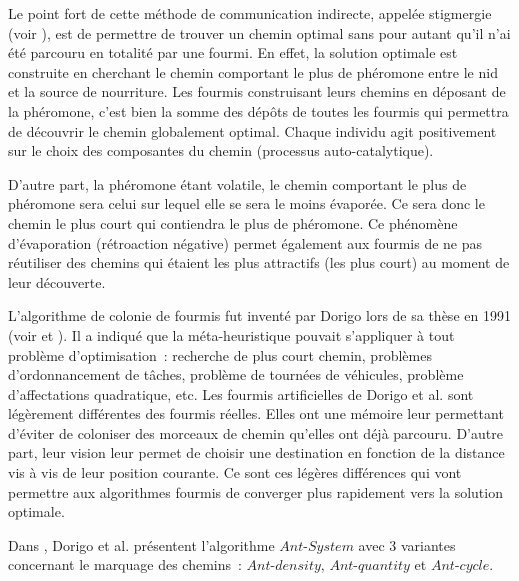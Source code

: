 Le point fort de cette méthode de communication indirecte, appelée stigmergie (voir \cite{Grasse1959}), est de permettre de trouver un chemin optimal sans pour autant qu'il n'ai été parcouru en totalité par une fourmi. En effet, la solution optimale est construite en cherchant le chemin comportant le plus de phéromone entre le nid et la source de nourriture. Les fourmis construisant leurs chemins en déposant de la phéromone, c'est bien la somme des dépôts de toutes les fourmis qui permettra de découvrir le chemin globalement optimal. Chaque individu agit positivement sur le choix des composantes du chemin (processus auto-catalytique).

D'autre part, la phéromone étant volatile, le chemin comportant le plus de phéromone sera celui sur lequel elle se sera le moins évaporée.
Ce sera donc le chemin le plus court qui contiendra le plus de phéromone.
Ce phénomène d'évaporation (rétroaction négative) permet également aux fourmis de ne pas réutiliser des chemins qui étaient les plus attractifs (les plus court) au moment de leur découverte.

L'algorithme de colonie de fourmis fut inventé par Dorigo lors de sa thèse en 1991 (voir \cite{Dorigo1992} et \cite{Dorigo1991}). Il a indiqué que la méta-heuristique pouvait s'appliquer à tout problème d'optimisation~: recherche de plus court chemin, problèmes d'ordonnancement de tâches, problème de tournées de véhicules, problème d'affectations quadratique, etc.
Les fourmis artificielles de Dorigo et al. sont légèrement différentes des fourmis réelles. Elles ont une mémoire leur permettant d'éviter de coloniser des morceaux de chemin qu'elles ont déjà parcouru. D'autre part, leur vision leur permet de choisir une destination en fonction de la distance vis à vis de leur position courante. Ce sont ces légères différences qui vont permettre aux algorithmes fourmis de converger plus rapidement vers la solution optimale.

Dans \cite{Dorigo1992}, Dorigo et al. présentent l'algorithme $Ant$-$System$ avec 3 variantes concernant le marquage des chemins~: $Ant$-$density$, $Ant$-$quantity$ et $Ant$-$cycle$.

